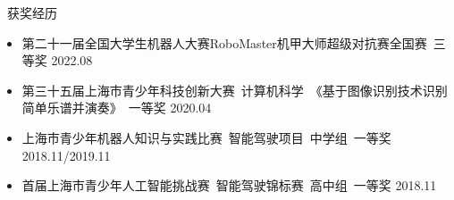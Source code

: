 \documentclass[UTF8]{resume}
\begin{document}
\begin{rSection}{\faAward~获奖经历}
    \begin{itemize}
        \itemsep -0.5em
        \item 第二十一届全国大学生机器人大赛RoboMaster机甲大师超级对抗赛全国赛~三等奖 \hfill 2022.08
        \item 第三十五届上海市青少年科技创新大赛~计算机科学~《基于图像识别技术识别简单乐谱并演奏》~一等奖 \hfill 2020.04
        \item 上海市青少年机器人知识与实践比赛~智能驾驶项目~中学组~一等奖 \hfill 2018.11/2019.11
        \item 首届上海市青少年人工智能挑战赛~智能驾驶锦标赛~高中组~一等奖 \hfill 2018.11
    \end{itemize}
\end{rSection}
\end{document}

